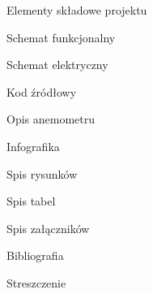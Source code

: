 \documentclass[12pt,a4paper]{scrartcl}
\begin{document}
\newpage
\begin{section} {\fontsize{14pt}{16.8pt} \tytulyrozdzialow Elementy składowe projektu} 
	{
	
}
\end{section}
\newpage
\begin{section} {\fontsize{14pt}{16.8pt} \tytulyrozdzialow Schemat funkcjonalny} 
	{
		
	}
\end{section}
\newpage
\begin{section} {\fontsize{14pt}{16.8pt} \tytulyrozdzialow Schemat elektryczny} 
	{
		
	}
\end{section}
\newpage
\begin{section} {\fontsize{14pt}{16.8pt} \tytulyrozdzialow Kod źródłowy} 
	{
		
	}
\end{section}
\newpage
\begin{section} {\fontsize{14pt}{16.8pt} \tytulyrozdzialow Opis anemometru} 
	{
		
	}
\end{section}
\newpage
\begin{section} {\fontsize{14pt}{16.8pt} \tytulyrozdzialow Infografika} 
	{
		
	}
\end{section}
\newpage
\begin{section} {\fontsize{14pt}{16.8pt} \tytulyrozdzialow Spis rysunków} 
	{
		
	}
\end{section}
\newpage
\begin{section} {\fontsize{14pt}{16.8pt} \tytulyrozdzialow Spis tabel} 
	{
		
	}
\end{section}
\newpage
\begin{section} {\fontsize{14pt}{16.8pt} \tytulyrozdzialow Spis załączników} 
	{
		
	}
\end{section}
\newpage
\begin{section} {\fontsize{14pt}{16.8pt} \tytulyrozdzialow Bibliografia} 
	{
		
	}
\end{section}
\newpage
\begin{section} {\fontsize{14pt}{16.8pt} \tytulyrozdzialow Streszczenie} 
	{
		
	}
\end{section}
\end{document}
